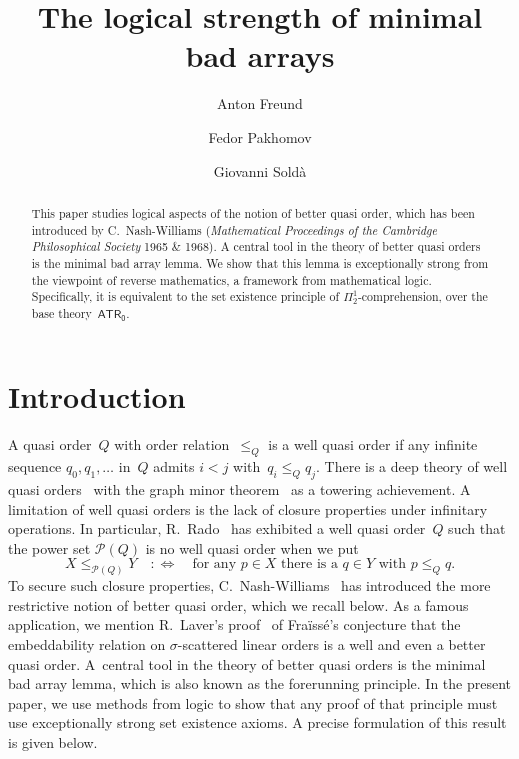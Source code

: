 \documentclass{amsart}
\title{The logical strength of minimal bad arrays}
\author{Anton Freund}
\author{Fedor Pakhomov}
\author{Giovanni Sold\`a}
\numberwithin{theorem}{section}
\theoremstyle{definition}
\begin{document}
\begin{abstract}
This paper studies logical aspects of the notion of better quasi order, which has been introduced by C.~Nash-Williams (\emph{Mathematical Proceedings of the Cambridge Philosophical Society} 1965 \& 1968). A central tool in the theory of better quasi orders is the minimal bad array lemma. We show that this lemma is exceptionally strong from the viewpoint of reverse mathematics, a framework from mathematical logic. Specifically, it is equivalent to the set existence principle of $\Pi^1_2$-comprehension, over the base theory~$\mathsf{ATR_0}$. 
\end{abstract}


\maketitle

\section{Introduction}

A quasi order~$Q$ with order relation~$\leq_Q$ is a well quasi order if any infinite sequence $q_0,q_1,\ldots$ in~$Q$ admits $i<j$ with~$q_i\leq_Q q_j$. There is a deep theory of well quasi orders~\cite{kruskal-rediscovered} with the graph minor theorem~\cite{robertson-seymour-gm} as a towering achievement. A limitation of well quasi orders is the lack of closure properties under infinitary operations. In particular, R.~Rado~\cite{rado-counterexample} has exhibited a well quasi order~$Q$ such that the power set $\mathcal P(Q)$ is no well quasi order when we put
\begin{equation*}
X\leq_{\mathcal P(Q)}Y\quad:\Leftrightarrow\quad\text{for any~$p\in X$ there is a~$q\in Y$ with $p\leq_Q q$}.
\end{equation*}
To secure such closure properties, C.~Nash-Williams~\cite{nash-williams-trees,nash-williams-bqo} has introduced the more restrictive notion of better quasi order, which we recall below. As a famous application, we mention R.~Laver's proof~\cite{laver71} of Fra\"iss\'e's conjecture that the embeddability relation on $\sigma$-scattered linear orders is a well and even a better quasi order. A~central tool in the theory of better quasi orders is the minimal bad array lemma, which is also known as the forerunning principle. In the present paper, we use methods from logic to show that any proof of that principle must use exceptionally strong set existence axioms. A precise formulation of this result is given below.
\end{document}
